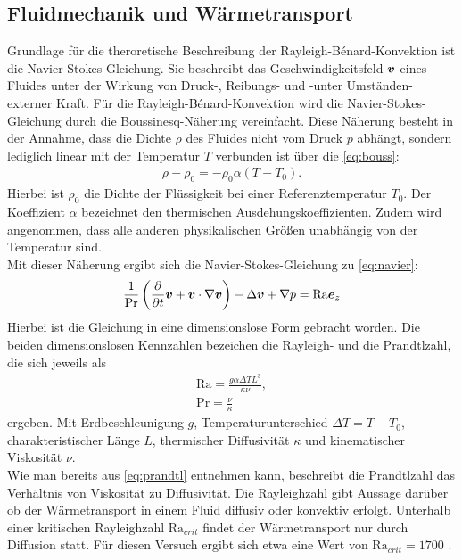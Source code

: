 \subsection{Fluidmechanik und Wärmetransport}
Grundlage für die theroretische Beschreibung der Rayleigh-B\'enard-Konvektion ist die Navier-Stokes-Gleichung. Sie beschreibt das Geschwindigkeitsfeld $\boldsymbol v$ eines Fluides unter der Wirkung von Druck-, Reibungs- und -unter Umständen- externer Kraft.
Für die Rayleigh-B\'enard-Konvektion wird die Navier-Stokes-Gleichung durch die Boussinesq-Näherung vereinfacht.
Diese Näherung besteht in der Annahme, dass die Dichte $\rho$ des Fluides nicht vom Druck $p$ abhängt, sondern lediglich linear mit der Temperatur $T$ verbunden ist über die \cref{eq:bouss}:
\begin{align}
\rho-\rho_0 = -\rho_0\alpha(T-T_0). \label{eq:bouss}
\end{align}
Hierbei ist $\rho_0$ die Dichte der Flüssigkeit bei einer Referenztemperatur $T_0$. Der Koeffizient $\alpha$ bezeichnet den thermischen Ausdehungskoeffizienten. Zudem wird angenommen, dass alle anderen physikalischen Größen unabhängig von der Temperatur sind.
\\
Mit dieser Näherung ergibt sich die Navier-Stokes-Gleichung zu \cref{eq:navier}:
\begin{align}
\frac{1}{\text{Pr}}\left(\frac{\partial}{\partial t} \boldsymbol v + \boldsymbol v \cdot \nabla \boldsymbol v \right) -\Delta \boldsymbol v + \nabla p = \text{Ra} \boldsymbol e_z \label{eq:navier}
\end{align}
Hierbei ist die Gleichung in eine dimensionslose Form gebracht worden. Die beiden dimensionslosen Kennzahlen bezeichen die Rayleigh- und die Prandtlzahl, die sich jeweils als 
\begin{align}
\text{Ra} = \frac{g\alpha\Delta T L^3}{\kappa\nu} \label{eq:rayleigh}, \\
\text{Pr} = \frac{\nu}{\kappa} \label{eq:pradtl}
\end{align}
ergeben. Mit Erdbeschleunigung $g$, Temperaturunterschied $\Delta T = T-T_0$, charakteristischer Länge $L$, thermischer Diffusivität $\kappa$ und kinematischer Viskosität $\nu$.
\\
Wie man bereits aus \cref{eq:prandtl} entnehmen kann, beschreibt die Prandtlzahl das Verhältnis von Viskosität zu Diffusivität. Die Rayleighzahl gibt Aussage darüber ob der Wärmetransport in einem Fluid diffusiv oder konvektiv erfolgt. Unterhalb einer kritischen Rayleighzahl $\text{Ra}_{crit}$ findet der Wärmetransport nur durch Diffusion statt. Für diesen Versuch ergibt sich etwa eine Wert von $\text{Ra}_{crit} = 1700$ \cite{Racrit}.
